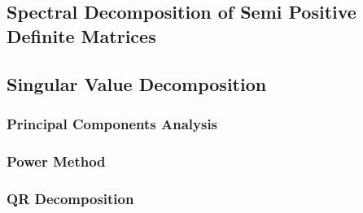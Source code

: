 \subsection{Spectral Decomposition of Semi Positive Definite Matrices}
\subsection{Singular Value Decomposition}
\subsubsection{Principal Components Analysis}
\subsubsection{Power Method}
\subsubsection{QR Decomposition}